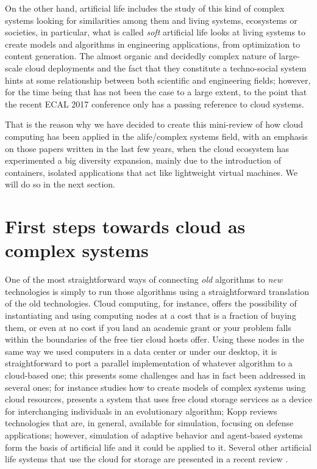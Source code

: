 \documentclass[utf8]{frontiersSCNS} %
\begin{document}
On the other hand, artificial life \citep{wiki:alife} includes the
study of this kind of complex systems looking for similarities among
them and living systems, ecosystems or societies, in particular, what
is called {\em soft} artificial life looks at living systems to create
models and algorithms in engineering applications, from optimization
to content generation. The almost organic and decidedly complex nature
of large-scale cloud deployments and the fact that they constitute a
techno-social system \citep{vespignani2009predicting,JJ2016} hints at 
some relationship between both scientific and engineering fields; however,
for the time being that has not been the case to a large extent, to the point
that the recent ECAL 2017 conference \citep{ecal17} only has a passing reference to cloud systems.

That is the reason why we have decided to create this
mini-review of how cloud computing has been applied in the
alife/complex systems field, with an emphasis on those papers written
in the last few years, when the cloud ecosystem has experimented a big
diversity expansion, mainly due to the introduction of containers,
isolated applications that act like lightweight virtual machines. We
will do so in the next section.

\section{First steps towards cloud as complex systems}

One of the most straightforward ways of connecting {\em old} algorithms to
{\em new} technologies is simply to run those algorithms using a
straightforward translation of the old technologies. Cloud computing,
for instance, offers the possibility of instantiating and using computing nodes
at a cost that is a fraction of buying them, or even at no cost if you
land an academic grant or your problem falls within the boundaries of
the free tier cloud hosts offer. Using these nodes in the same way we
used computers in a data center or under our desktop, it is
straightforward to port a parallel implementation of
whatever algorithm to a cloud-based one; this presents some challenges and
has in fact been addressed in several ones; for instance \citep{Medel2017}
studies how to create models of complex systems using cloud resources,
\cite{mericloud}
presents a system that uses free cloud
storage services as a device for interchanging individuals in an
evolutionary algorithm; Kopp \citep{Kopp2016} reviews technologies
that are, in general, available for simulation, focusing on defense
applications; however, simulation of adaptive behavior and agent-based
systems form the basis of artificial life and it could be applied to
it. Several other artificial life systems that use
the cloud for storage are presented in a recent review
\citep{taylor2016webal}.
\end{document}
